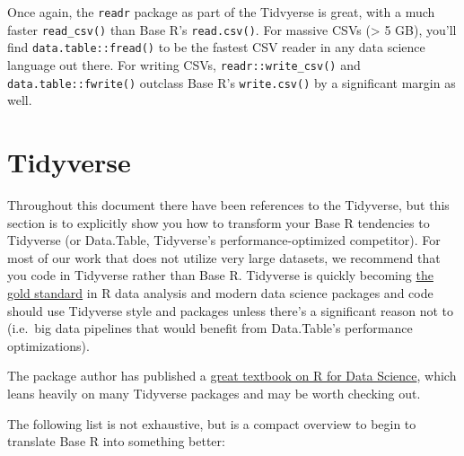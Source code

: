\documentclass[]{book}
\begin{document}
Once again, the \texttt{readr} package as part of the Tidvyerse is great, with a much faster \texttt{read\_csv()} than Base R's \texttt{read.csv()}. For massive CSVs (\textgreater{} 5 GB), you'll find \texttt{data.table::fread()} to be the fastest CSV reader in any data science language out there. For writing CSVs, \texttt{readr::write\_csv()} and \texttt{data.table::fwrite()} outclass Base R's \texttt{write.csv()} by a significant margin as well.

\hypertarget{tidyverse}{%
\section{Tidyverse}\label{tidyverse}}

Throughout this document there have been references to the Tidyverse, but this section is to explicitly show you how to transform your Base R tendencies to Tidyverse (or Data.Table, Tidyverse's performance-optimized competitor). For most of our work that does not utilize very large datasets, we recommend that you code in Tidyverse rather than Base R. Tidyverse is quickly becoming \href{https://rviews.rstudio.com/2017/06/08/what-is-the-tidyverse/}{the gold standard} in R data analysis and modern data science packages and code should use Tidyverse style and packages unless there's a significant reason not to (i.e.~big data pipelines that would benefit from Data.Table's performance optimizations).

The package author has published a \href{https://r4ds.had.co.nz/}{great textbook on R for Data Science}, which leans heavily on many Tidyverse packages and may be worth checking out.

The following list is not exhaustive, but is a compact overview to begin to translate Base R into something better:
\end{document}
